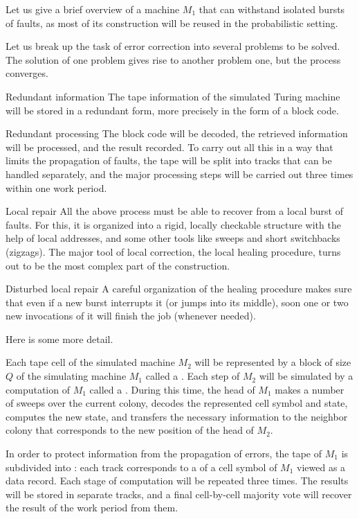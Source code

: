 \documentclass[12pt]{memoir}
\begin{document}
Let us give a brief overview of a machine \( M_1 \) that
can withstand isolated bursts of faults, as most of its construction will be reused
in the probabilistic setting.

Let us break up the task of error correction into several 
problems to be solved.
The solution of one problem gives rise to another problem one, 
but the process converges.
\begin{flushdescription}
\item[Redundant information] The tape information of the simulated Turing machine
will be stored in a redundant form, more precisely in the form of a block code.
\item[Redundant processing] The block code will be decoded, the retrieved information 
will be processed, and the result recorded.
To carry out all this in a way that limits the propagation of faults, the tape will be split
into tracks that can be handled separately, and the major processing steps will be 
carried out three times within one work period.
\item[Local repair] All the above process must be able to recover from a local burst of faults.
For this, it is organized into a rigid, locally checkable structure
with the help of local addresses, and some other tools like sweeps and 
short switchbacks (zigzags).
The major tool of local correction, the local healing procedure, turns out to be the most
complex part of the construction.
\item[Disturbed local repair] A careful organization of the healing procedure
makes sure that even if a new burst interrupts it (or jumps into its middle),
soon one or two new invocations of it will finish the job (whenever needed).
\end{flushdescription}

Here is some more detail.

Each tape cell of the simulated machine \( M_{2} \) will be represented by a block of
size \( Q \) of the simulating machine \( M_{1} \) called a .
Each step of \( M_{2} \) will be simulated by a computation of \( M_{1} \) called
a .
During this time, the head of \( M_{1} \) makes a number of sweeps over the
current colony, decodes the represented cell symbol and state,
computes the new state, and transfers the necessary information to the 
neighbor colony that corresponds to the new position of the head of \( M_{2} \).

In order to protect information from the propagation of errors,
the tape of \( M_{1} \) is subdivided into : each track corresponds to a 
 of a cell symbol of \( M_{1} \) viewed as a data record.
Each stage of computation will be repeated three times.
The results will be stored in separate tracks, and a final cell-by-cell majority vote
will recover the result of the work period from them.
\end{document}
